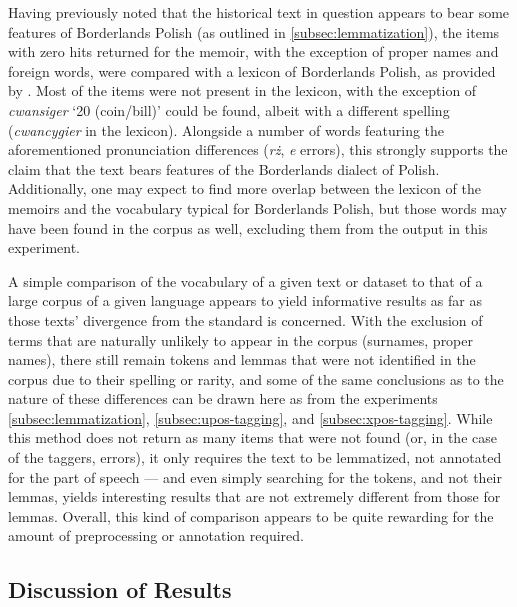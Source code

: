 Having previously noted that the historical text in question appears to bear some features of Borderlands Polish (as outlined in \autoref{subsec:lemmatization}), the items with zero hits returned for the memoir, with the exception of proper names and foreign words, were compared with a lexicon of Borderlands Polish, as provided by \citet{kurzowa_1983}. Most of the items were not present in the lexicon, with the exception of \textit{cwansiger} `20 (coin/bill)' could be found, albeit with a different spelling (\textit{cwancygier} in the lexicon). Alongside a number of words featuring the aforementioned pronunciation differences (\textit{rż}, \textit{e} errors), this strongly supports the claim that the text bears features of the Borderlands dialect of Polish. Additionally, one may expect to find more overlap between the lexicon of the memoirs and the vocabulary typical for Borderlands Polish, but those words may have been found in the corpus as well, excluding them from the output in this experiment.

A simple comparison of the vocabulary of a given text or dataset to that of a large corpus of a given language appears to yield informative results as far as those texts' divergence from the standard is concerned. With the exclusion of terms that are naturally unlikely to appear in the corpus (surnames, proper names), there still remain tokens and lemmas that were not identified in the corpus due to their spelling or rarity, and some of the same conclusions as to the nature of these differences can be drawn here as from the experiments \autoref{subsec:lemmatization}, \autoref{subsec:upos-tagging}, and \autoref{subsec:xpos-tagging}. While this method does not return as many items that were not found (or, in the case of the taggers, errors), it only requires the text to be lemmatized, not annotated for the part of speech --- and even simply searching for the tokens, and not their lemmas, yields interesting results that are not extremely different from those for lemmas. Overall, this kind of comparison appears to be quite rewarding for the amount of preprocessing or annotation required.

\subsection{Discussion of Results}
\label{subsec:method-comparison}

